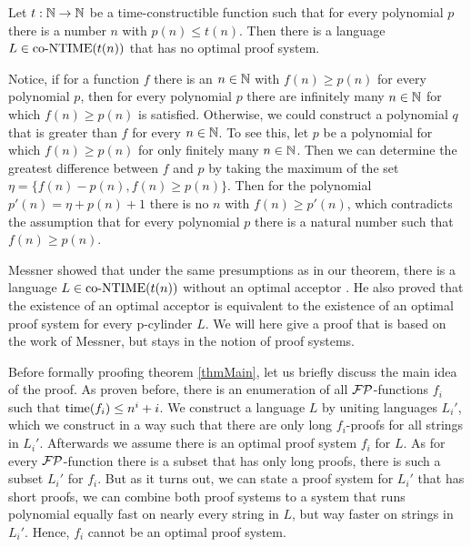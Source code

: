   \begin{theorem}\label{thmMain}
    Let \(t : \mathbb{N} \to \mathbb{N}\) be a time-constructible function such that for every polynomial \(p\) there is a number \(n\) with \(p(n) \leq t(n)\). Then there is a language \(L \in \text{co-NTIME}(t(n))\) that has no optimal proof system.
  \end{theorem}

  Notice, if for a function \(f\) there is an \(n \in \mathbb{N}\) with \(f(n) \geq p(n)\) for every polynomial \(p\), then for every polynomial \(p\) there are infinitely many \(n \in \mathbb{N}\) for which \(f(n) \geq p(n)\) is satisfied. Otherwise, we could construct a polynomial \(q\) that is greater than \(f\) for every \(n \in \mathbb{N}\). To see this, let \(p\) be a polynomial for which \(f(n) \geq p(n)\) for only finitely many \(n \in \mathbb{N}\). Then we can determine the greatest difference between \(f\) and \(p\) by taking the maximum of the set \(\eta = \{ f(n) - p(n), f(n) \geq p(n) \}\). Then for the polynomial \(p'(n) = \eta + p(n) + 1\) there is no \(n\) with \(f(n) \geq p'(n)\), which contradicts the assumption that for every polynomial \(p\) there is a natural number such that \(f(n) \geq p(n)\).

  Messner showed that under the same presumptions as in our theorem, there is a language \(L \in \text{co-NTIME}(t(n))\) without an optimal acceptor \cite{Mes99}. He also proved that the existence of an optimal acceptor is equivalent to the existence of an optimal proof system for every p-cylinder \(L\). We will here give a proof that is based on the work of Messner, but stays in the notion of proof systems.

  Before formally proofing theorem \ref{thmMain}, let us briefly discuss the main idea of the proof. As proven before, there is an enumeration of all \(\mathcal{FP}\)-functions \(f_i\) such that \(\operatorname{time}(f_i) \leq n^i + i\). We construct a language \(L\) by uniting languages \(L_i'\), which we construct in a way such that there are only long \(f_i\)-proofs for all strings in \(L_i'\). Afterwards we assume there is an optimal proof system \(f_i\) for \(L\). As for every \(\mathcal{FP}\)-function there is a subset that has only long proofs, there is such a subset \(L_i'\) for \(f_i\). But as it turns out, we can state a proof system for \(L_i'\) that has short proofs, we can combine both proof systems to a system that runs polynomial equally fast on nearly every string in \(L\), but way faster on strings in \(L_i'\). Hence, \(f_i\) cannot be an optimal proof system.
  
